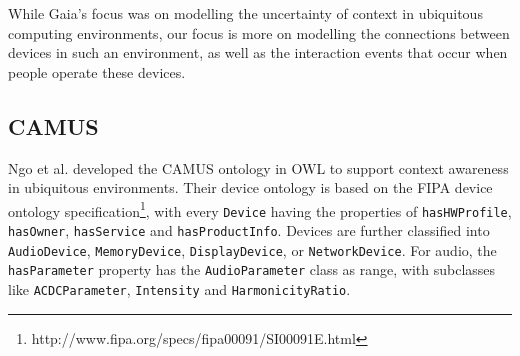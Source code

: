 


While Gaia's focus was on modelling the uncertainty of context in ubiquitous computing environments, our focus is more on modelling the connections between devices in such an environment, as well as the interaction events that occur when people operate these devices.



\subsection{CAMUS}

Ngo et al. \cite{Ngo2004} developed the \ac{CAMUS} ontology in \ac{OWL} to support context awareness in ubiquitous environments. Their device ontology is based on the \ac{FIPA} device ontology specification\footnote{http://www.fipa.org/specs/fipa00091/SI00091E.html}, with every \texttt{Device} having the properties of \texttt{hasHWProfile}, \texttt{hasOwner}, \texttt{hasService} and \texttt{hasProductInfo}. Devices are further classified into \texttt{AudioDevice}, \texttt{MemoryDevice}, \texttt{DisplayDevice}, or \texttt{NetworkDevice}. For audio, the \texttt{hasParameter} property has the \texttt{Audio\-Parameter} class as range, with subclasses like \texttt{ACDC\-Parameter}, \texttt{In\-ten\-si\-ty} and \texttt{Harmonicity\-Ratio}. %

